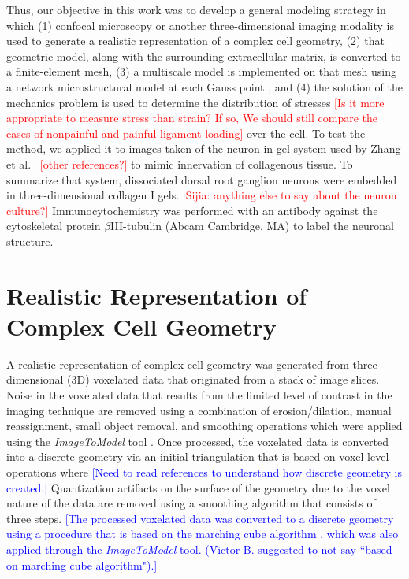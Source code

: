 \documentclass[]{interact}
\newcommand{\blue}[1]{\textcolor{blue}{[#1]}}
\newcommand{\red}[1]{\textcolor{red}{[#1]}}
\begin{document}
Thus, our objective in this work was to develop a general modeling strategy in which (1) confocal microscopy or another three-dimensional imaging modality is used to generate a realistic representation of a complex cell geometry, (2) that geometric model, along with the surrounding extracellular matrix, is converted to a finite-element mesh, (3) a multiscale model is implemented on that mesh using a network microstructural model at each Gauss point \citep{Chandran:2007hy,Stylianopoulos:2007dp}, and (4) the solution of the mechanics problem is used to determine the distribution of stresses \red{Is it more appropriate to measure stress than strain? If so, We should still compare the cases of nonpainful and painful ligament loading} over the cell. To test the method, we applied it to images taken of the neuron-in-gel system used by Zhang et al.\ \citep{Zhang:2016ga} \red{other references?} to  mimic innervation of collagenous tissue. To summarize that system, dissociated dorsal root ganglion neurons were embedded in three-dimensional collagen I gels. \red{Sijia: anything else to say about the neuron culture?} Immunocytochemistry was performed with an antibody against the cytoskeletal protein $\beta$III-tubulin (Abcam Cambridge, MA) to label the neuronal structure.

\section{Realistic Representation of Complex Cell Geometry}

A realistic representation of complex cell geometry was generated from three-dimensional (3D) voxelated data that originated from a stack of image slices. Noise in the voxelated data that results from the limited level of contrast in the imaging technique are removed using a combination of erosion/dilation, manual reassignment, small object removal, and smoothing operations which were applied using the \textit{ImageToModel} tool \citep{Klaas:2013ug, Klaas_conference, simmetrix}. Once processed, the voxelated data is converted into a discrete geometry via an initial triangulation that is based on voxel level operations where \blue{Need to read references to understand how discrete geometry is created.} Quantization artifacts on the surface of the geometry due to the voxel nature of the data are removed using a smoothing algorithm that consists of three steps. \blue{The processed voxelated data was converted to a discrete geometry using a procedure that is based on the marching cube algorithm \citep{Lorensen:1987vr}, which was also applied through the \textit{ImageToModel} tool. (Victor B. suggested to not say ``based on marching cube algorithm").}
\end{document}
